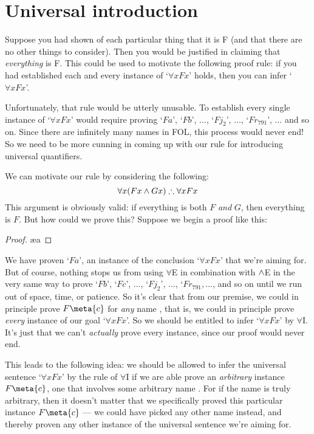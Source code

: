 \section{Universal introduction}
Suppose you had shown of each particular thing that it is F (and that there are no other things to consider). Then you would be justified in claiming that \emph{everything} is F. This could be used to motivate the following proof rule: if you had established each and every instance of `$\forall x Fx$' holds, then you can infer `$\forall x Fx$'.

Unfortunately, that rule would be utterly unusable. To establish every single instance of `$\forall x Fx$' would require proving `$Fa$', `$Fb$', $\ldots$, `$Fj_2$', $\ldots$, `$Fr_{791}$', $\ldots$ and so on. Since there are infinitely many names in FOL, this process would never end! So we need to be more cunning in coming up with our rule for introducing universal quantifiers.

We can motivate our rule by considering the following:
$$\forall x (Fx \wedge Gx) \therefore \forall x Fx$$
This argument is obviously valid: if everything is both $F$ \emph{and} $G$, then everything is $F$.  But how could we prove this?  Suppose we begin a proof like this:
\begin{proof}
	 
	 
	 \ae{a}
\end{proof}
We have proven `$Fa$', an instance of the conclusion `$\forall xFx$' that we're aiming for.  But of course, nothing stops us from using $\forall$E in combination with $\wedge$E in the very same way to prove `$Fb$', `$Fc$', $\ldots$, `$Fj_2$', $\ldots$, `$Fr_{791}, \ldots$, and so on until we run out of space, time, or patience.   So it's clear that from our premise, we could in principle prove $F\meta{c}$ for \emph{any} name , that is, we could in principle prove \emph{every} instance of our goal `$\forall x Fx$'.  So we should be entitled to infer `$\forall x Fx$' by $\forall$I.  It's just that we can't \emph{actually} prove every instance, since our proof would never end.

This leads to the following idea: we should be allowed to infer the universal sentence `$\forall x Fx$' by the rule of $\forall$I if we are able prove an \emph{arbitrary} instance $F\meta{c}$, one that involves some arbitrary name .  For if the name  is truly arbitrary, then it doesn't matter that we specifically proved this particular instance $F\meta{c}$  --- we could have picked any other name instead, and thereby proven any other instance of the universal sentence we're aiming for.

